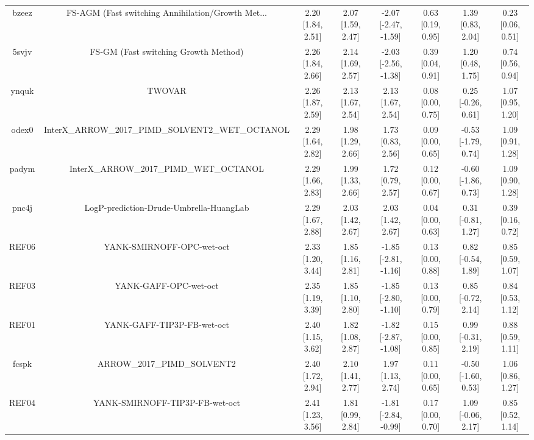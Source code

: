 \documentclass{article}
\begin{document}
\begin{center}
\begin{longtable}{|cccccccc|}
 bzeez &  FS-AGM (Fast switching Annihilation/Growth Met... &  2.20 [1.84, 2.51] &  2.07 [1.59, 2.47] &  -2.07 [-2.47, -1.59] &  0.63 [0.19, 0.95] &    1.39 [0.83, 2.04] &     0.23 [0.06, 0.51] \\
 5svjv &               FS-GM (Fast switching Growth Method) &  2.26 [1.84, 2.66] &  2.14 [1.69, 2.57] &  -2.03 [-2.56, -1.38] &  0.39 [0.04, 0.91] &    1.20 [0.48, 1.75] &     0.74 [0.56, 0.94] \\
 ynquk &                                             TWOVAR &  2.26 [1.87, 2.59] &  2.13 [1.67, 2.54] &     2.13 [1.67, 2.54] &  0.08 [0.00, 0.75] &   0.25 [-0.26, 0.61] &     1.07 [0.95, 1.20] \\
 odex0 &  InterX\_ARROW\_2017\_PIMD\_SOLVENT2\_WET\_OCTANOL &  2.29 [1.64, 2.82] &  1.98 [1.29, 2.66] &     1.73 [0.83, 2.56] &  0.09 [0.00, 0.65] &  -0.53 [-1.79, 0.74] &     1.09 [0.91, 1.28] \\
 padym &            InterX\_ARROW\_2017\_PIMD\_WET\_OCTANOL &  2.29 [1.66, 2.83] &  1.99 [1.33, 2.66] &     1.72 [0.79, 2.57] &  0.12 [0.00, 0.67] &  -0.60 [-1.86, 0.73] &     1.09 [0.90, 1.28] \\
 pnc4j &            LogP-prediction-Drude-Umbrella-HuangLab &  2.29 [1.67, 2.88] &  2.03 [1.42, 2.67] &     2.03 [1.42, 2.67] &  0.04 [0.00, 0.63] &   0.31 [-0.81, 1.27] &     0.39 [0.16, 0.72] \\
 REF06 &                          YANK-SMIRNOFF-OPC-wet-oct &  2.33 [1.20, 3.44] &  1.85 [1.16, 2.81] &  -1.85 [-2.81, -1.16] &  0.13 [0.00, 0.88] &   0.82 [-0.54, 1.89] &     0.85 [0.59, 1.07] \\
 REF03 &                              YANK-GAFF-OPC-wet-oct &  2.35 [1.19, 3.39] &  1.85 [1.10, 2.80] &  -1.85 [-2.80, -1.10] &  0.13 [0.00, 0.79] &   0.85 [-0.72, 2.14] &     0.84 [0.53, 1.12] \\
 REF01 &                         YANK-GAFF-TIP3P-FB-wet-oct &  2.40 [1.15, 3.62] &  1.82 [1.08, 2.87] &  -1.82 [-2.87, -1.08] &  0.15 [0.00, 0.85] &   0.99 [-0.31, 2.19] &     0.88 [0.59, 1.11] \\
 fcspk &                        ARROW\_2017\_PIMD\_SOLVENT2 &  2.40 [1.72, 2.94] &  2.10 [1.41, 2.77] &     1.97 [1.13, 2.74] &  0.11 [0.00, 0.65] &  -0.50 [-1.60, 0.53] &     1.06 [0.86, 1.27] \\
 REF04 &                     YANK-SMIRNOFF-TIP3P-FB-wet-oct &  2.41 [1.23, 3.56] &  1.81 [0.99, 2.84] &  -1.81 [-2.84, -0.99] &  0.17 [0.00, 0.70] &   1.09 [-0.06, 2.17] &     0.85 [0.52, 1.14] \\

\end{longtable}
\end{center}
\end{document}
